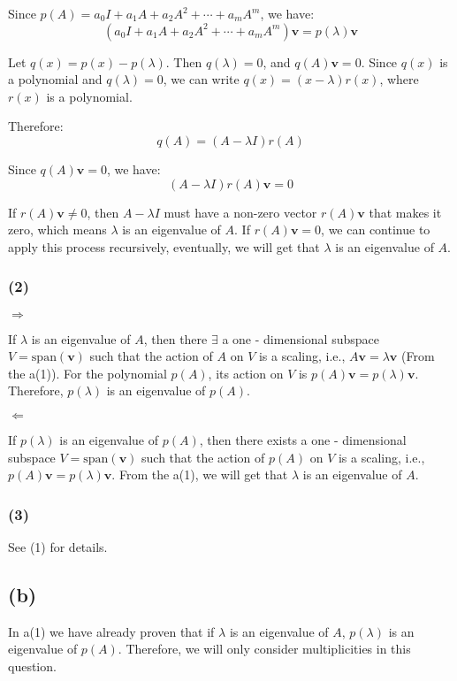 \documentclass{article}
\begin{document}
Since $ p(A)=a_0I + a_1A + a_2A^2+\cdots + a_mA^m $, we have:
$$
(a_0I + a_1A + a_2A^2+\cdots + a_mA^m)\mathbf{v}=p(\lambda)\mathbf{v}
$$

Let $ q(x)=p(x)-p(\lambda) $. Then $ q(\lambda)=0 $, and $ q(A)\mathbf{v}=0 $. Since $ q(x) $ is a polynomial and $ q(\lambda)=0 $, we can write $ q(x)=(x - \lambda)r(x) $, where $ r(x) $ is a polynomial.

Therefore:
$$
q(A)=(A-\lambda I)r(A)
$$

Since $ q(A)\mathbf{v}=0 $, we have:
$$
(A - \lambda I)r(A)\mathbf{v}=0
$$

If $ r(A)\mathbf{v}\neq0 $, then $ A-\lambda I $ must have a non-zero vector $ r(A)\mathbf{v} $ that makes it zero, which means $ \lambda $ is an eigenvalue of $ A $. If $ r(A)\mathbf{v}=0 $, we can continue to apply this process recursively, eventually, we will get that $ \lambda $ is an eigenvalue of $ A $.

\subsubsection*{(2)} 

$\Rightarrow$

If $ \lambda $ is an eigenvalue of $ A $, then there $\exists$ a one - dimensional subspace $ V=\text{span}(\mathbf{v}) $ such that the action of $ A $ on $ V $ is a scaling, i.e., $ A\mathbf{v}=\lambda\mathbf{v} $ (From the a(1)). For the polynomial $ p(A) $, its action on $ V $ is $ p(A)\mathbf{v}=p(\lambda)\mathbf{v} $. Therefore, $ p(\lambda) $ is an eigenvalue of $ p(A) $.

$\Leftarrow$

If $ p(\lambda) $ is an eigenvalue of $ p(A) $, then there exists a one - dimensional subspace $ V = \text{span}(\mathbf{v}) $ such that the action of $ p(A) $ on $ V $ is a scaling, i.e., $ p(A)\mathbf{v}=p(\lambda)\mathbf{v} $. From the a(1), we will get that $ \lambda $ is an eigenvalue of $ A $.

\subsubsection*{(3)} 

See (1) for details.

\subsection*{(b)} 

In a(1) we have already proven that if $ \lambda $ is an eigenvalue of $ A $, $ p(\lambda) $ is an eigenvalue of $ p(A) $. Therefore, we will only consider multiplicities in this question.
\end{document}
